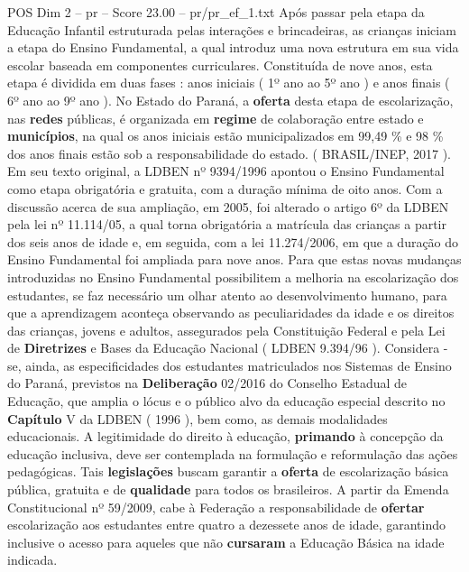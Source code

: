 \begin{textsample}{POS Dim 2 – pr – Score 23.00 – pr/pr\_ef\_1.txt}  \label{ex:f2_pos_120}
Após passar pela etapa da Educação Infantil estruturada pelas interações e brincadeiras, as crianças iniciam a etapa do Ensino Fundamental, a qual introduz uma nova estrutura em sua vida escolar baseada em componentes curriculares.
Constituída de nove anos, esta etapa é dividida em duas fases : anos iniciais ( 1º ano ao 5º ano ) e anos finais ( 6º ano ao 9º ano ).
No Estado do Paraná, a \textbf{oferta} desta etapa de escolarização, nas \textbf{redes} públicas, é organizada em \textbf{regime} de colaboração entre estado e \textbf{municípios}, na qual os anos iniciais estão municipalizados em 99,49 \% e 98 \% dos anos finais estão sob a responsabilidade do estado. ( BRASIL/INEP, 2017 ).
Em seu texto original, a LDBEN nº 9394/1996 apontou o Ensino Fundamental como etapa obrigatória e gratuita, com a duração mínima de oito anos.
Com a discussão acerca de sua ampliação, em 2005, foi alterado o artigo 6º da LDBEN pela lei nº 11.114/05, a qual torna obrigatória a matrícula das crianças a partir dos seis anos de idade e, em seguida, com a lei 11.274/2006, em que a duração do Ensino Fundamental foi ampliada para nove anos.
Para que estas novas mudanças introduzidas no Ensino Fundamental possibilitem a melhoria na escolarização dos estudantes, se faz necessário um olhar atento ao desenvolvimento humano, para que a aprendizagem aconteça observando as peculiaridades da idade e os direitos das crianças, jovens e adultos, assegurados pela Constituição Federal e pela Lei de \textbf{Diretrizes} e Bases da Educação Nacional ( LDBEN 9.394/96 ).
Considera -se, ainda, as especificidades dos estudantes matriculados nos Sistemas de Ensino do Paraná, previstos na \textbf{Deliberação} 02/2016 do Conselho Estadual de Educação, que amplia o lócus e o público alvo da educação especial descrito no \textbf{Capítulo} V da LDBEN ( 1996 ), bem como, as demais modalidades educacionais.
A legitimidade do direito à educação, \textbf{primando} à concepção da educação inclusiva, deve ser contemplada na formulação e reformulação das ações pedagógicas.
Tais \textbf{legislações} buscam garantir a \textbf{oferta} de escolarização básica pública, gratuita e de \textbf{qualidade} para todos os brasileiros.
A partir da Emenda Constitucional nº 59/2009, cabe à Federação a responsabilidade de \textbf{ofertar} escolarização aos estudantes entre quatro a dezessete anos de idade, garantindo inclusive o acesso para aqueles que não \textbf{cursaram} a Educação Básica na idade indicada.

\end{textsample}
